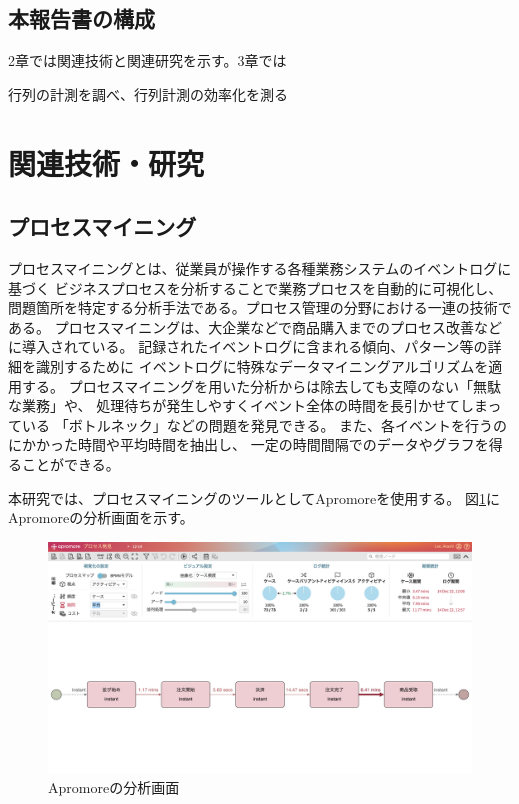 \documentclass{jsarticle}
\begin{document}
\subsection{本報告書の構成}
2章では関連技術と関連研究を示す。3章では

行列の計測を調べ、行列計測の効率化を測る




\newpage


\section{関連技術・研究}
\subsection{プロセスマイニング}
プロセスマイニングとは、従業員が操作する各種業務システムのイベントログに基づく
ビジネスプロセスを分析することで業務プロセスを自動的に可視化し、
問題箇所を特定する分析手法である。プロセス管理の分野における一連の技術である。
プロセスマイニングは、大企業などで商品購入までのプロセス改善などに導入されている。
記録されたイベントログに含まれる傾向、パターン等の詳細を識別するために
イベントログに特殊なデータマイニングアルゴリズムを適用する。
プロセスマイニングを用いた分析からは除去しても支障のない「無駄な業務」や、
処理待ちが発生しやすくイベント全体の時間を長引かせてしまっている
「ボトルネック」などの問題を発見できる。
また、各イベントを行うのにかかった時間や平均時間を抽出し、
一定の時間間隔でのデータやグラフを得ることができる。

本研究では、プロセスマイニングのツールとしてApromoreを使用する。
図\ref{fig:3}にApromoreの分析画面を示す。

\begin{figure}[H]
  \centering
  \includegraphics[width=15cm]{3.png}
  \caption{Apromoreの分析画面}
  \label{fig:3}
\end{figure}
\end{document}
